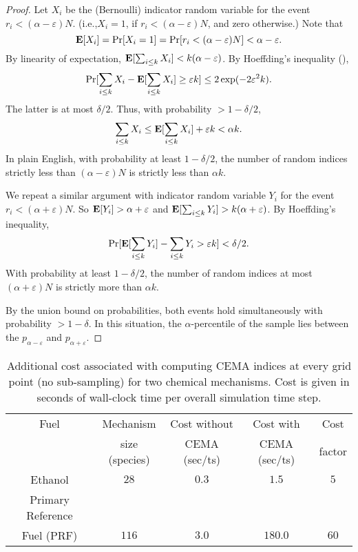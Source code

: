 \documentclass[final]{siamltex}
\newcommand{\eps}{\varepsilon}
\newcommand{\EX}{\hbox{\bf E}}
\newcommand{\pt}{{p}}
\newcommand{\samp}{k}
\begin{document}
\vspace{2ex}
\begin{proof} Let $X_i$ be the (Bernoulli) indicator random variable for the event $r_i < (\alpha-\eps)N$. (i.e.,$X_i = 1$, if $r_i < (\alpha-\eps)N$,
and zero otherwise.) Note that 
\[\EX[X_i] = \Pr[X_i = 1]=\Pr[r_i < (\alpha-\eps)N] < \alpha - \eps.
\]
By linearity of expectation, $\EX[\sum_{i\leq \samp} X_i] < \samp(\alpha - \eps)$. By Hoeffding's inequality (),
\[\Pr[\sum_{i \leq \samp} X_i - \EX[\sum_{i \leq \samp} X_i] \geq \eps \samp] \leq 2 \exp(-2 \eps^2\samp). \]
The latter is at most $\delta/2$. Thus, with probability $>1 - \delta/2$,
\[\sum_{i \leq \samp} X_i \leq \EX[\sum_{i \leq \samp} X_i] + \eps k < \alpha k.\]
In plain English, with probability at least $1-\delta/2$, the number of random indices
strictly less than $(\alpha-\eps)N$ is strictly less than $\alpha k$.

We repeat a similar argument with indicator random variable $Y_i$ for the event $r_i < (\alpha+\eps)N$. So $\EX[Y_i] > \alpha + \eps$
and $\EX[\sum_{i \leq \samp} Y_i] > \samp(\alpha + \eps)$. By Hoeffding's inequality,
\[ \Pr[\EX[\sum_{i \leq \samp} Y_i] - \sum_{i \leq \samp} Y_i > \eps \samp] < \delta/2.
\]
With probability at least $1-\delta/2$, the number of random indices at most $(\alpha+\eps)N$
is strictly more than $\alpha k$.

By the union bound on probabilities, both events hold simultaneously with probability $>1-\delta$.
In this situation, the $\alpha$-percentile of the sample lies between the $\pt_{\alpha-\eps}$
and $\pt_{\alpha+\eps}$.
\end{proof}
\begin{table}[t]
\caption{ Additional cost associated with computing CEMA indices at every grid point (no sub-sampling) for two chemical mechanisms. Cost is given in seconds of wall-clock time per overall simulation time step. \label{tab:cema_costs}}
\begin{center}
 \begin{tabular}{| c | c | c | c | c |}
 \hline \hline
Fuel         & Mechanism       &  Cost without    & Cost with       &  Cost     \\
             & size (species)  &    CEMA (sec/ts) & CEMA (sec/ts)   & factor    \\ \hline \hline 
 Ethanol     &    $28$           &     $0.3$      &  $1.5$            &  $5$     \\
\hline
Primary Reference & & & & \\
Fuel (PRF) & $116$          &     $3.0$      &  $180.0$          &  $60$    \\\hline \hline 
\end{tabular}
\end{center}
\end{table}  
\end{document}
